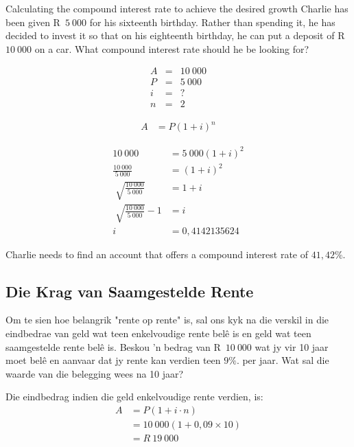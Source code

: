 \begin{wex}{Calculating the compound interest rate to achieve the desired growth}{
    Charlie has been given R~$5~000$ for his sixteenth birthday. Rather than spending it, he has decided to invest it so that on his eighteenth birthday, he can put a deposit of R~$10~000$ on a car. What compound interest rate should he be looking for?}{
    
    \begin{eqnarray*}
	A &=& 10~000\\
	P &=& 5~000\\
	i &=& ?\\
	n &=& 2
    \end{eqnarray*}

    \begin{align*}
	A &= P(1 + i)^n
    \end{align*}

    \begin{align*}
	10~000 &= 5~000(1 + i)^2\\
	\frac{10~000}{5~000}&= (1 +i)^2\\
	\sqrt[]{\frac{10~000}{5~000}} &= 1 + i\\
	\sqrt[]{\frac{10~000}{5~000}} - 1 &= i\\
	i &= 0,4142135624
    \end{align*}

    Charlie needs to find an account that offers a compound interest rate of $41,42\%$.
    }
\end{wex}


\subsection{Die Krag van Saamgestelde Rente}

Om te sien hoe belangrik "rente op rente" is, sal ons kyk na die verskil in die eindbedrae van geld wat teen
enkelvoudige rente belê is en geld wat teen saamgestelde rente belê is. Beskou ’n bedrag van R~$10~000$  wat jy
vir 10 jaar moet belê en aanvaar dat jy rente kan verdien teen $9\%$. per jaar. Wat sal die waarde van die belegging
wees na 10 jaar?\par

Die eindbedrag indien die geld enkelvoudige rente verdien, is:
\begin{align*}
    A &= P(1 + i \cdot n)\\
      &= 10~000(1 + 0,09 \times 10)\\
      &= R~19~000\\
\end{align*}

